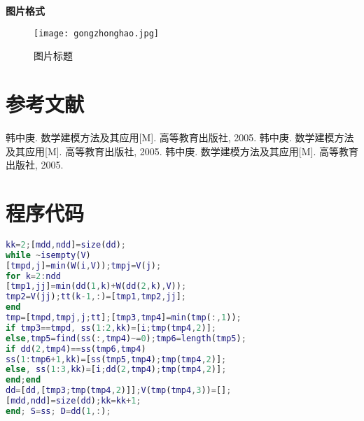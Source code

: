 \documentclass[bwprint]{gmcmthesis}
\begin{document}
\textbf{图片格式}
\begin{figure}[h]
\centering
\texttt{[image: gongzhonghao.jpg]}
\caption{图片标题}
\end{figure}

\section{参考文献}
\begin{thebibliography}{1.2}%
\setlength{\itemsep}{-2mm}
 韩中庚. 数学建模方法及其应用[M]. 高等教育出版社, 2005.
 韩中庚. 数学建模方法及其应用[M]. 高等教育出版社, 2005.
 韩中庚. 数学建模方法及其应用[M]. 高等教育出版社, 2005.
\end{thebibliography}

\newpage
\appendix
\section{程序代码}
\begin{lstlisting}[language=Matlab] 
kk=2;[mdd,ndd]=size(dd);
while ~isempty(V)
[tmpd,j]=min(W(i,V));tmpj=V(j);
for k=2:ndd
[tmp1,jj]=min(dd(1,k)+W(dd(2,k),V));
tmp2=V(jj);tt(k-1,:)=[tmp1,tmp2,jj];
end
tmp=[tmpd,tmpj,j;tt];[tmp3,tmp4]=min(tmp(:,1));
if tmp3==tmpd, ss(1:2,kk)=[i;tmp(tmp4,2)];
else,tmp5=find(ss(:,tmp4)~=0);tmp6=length(tmp5);
if dd(2,tmp4)==ss(tmp6,tmp4)
ss(1:tmp6+1,kk)=[ss(tmp5,tmp4);tmp(tmp4,2)];
else, ss(1:3,kk)=[i;dd(2,tmp4);tmp(tmp4,2)];
end;end
dd=[dd,[tmp3;tmp(tmp4,2)]];V(tmp(tmp4,3))=[];
[mdd,ndd]=size(dd);kk=kk+1;
end; S=ss; D=dd(1,:);
 \end{lstlisting}
\end{document}
